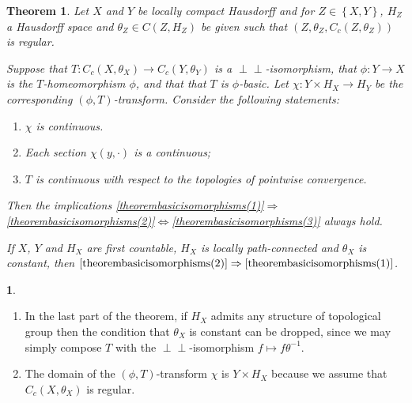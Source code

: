 \documentclass[letter,11pt]{amsart}
\theoremstyle{plain}		\newtheorem{theorem}[generalnumbering]{Theorem}
\theoremstyle{plain}		\newtheorem{corollary}[generalnumbering]{Corollary}
\theoremstyle{definition}		\newtheorem{definition}[generalnumbering]{Definition}
\theoremstyle{definition}		\newtheorem{example}[generalnumbering]{Example}
\theoremstyle{plain}		\newtheorem{proposition}[generalnumbering]{Proposition}
\theoremstyle{plain}		\newtheorem{lemma}[generalnumbering]{Lemma}
\newcommand{\namedenvironment}{}
\theoremstyle{definition}
\newtheorem*{theoremfornamed}{\namedenvironment}
\newenvironment{named}[1]{\renewcommand{\namedenvironment}{#1}\begin{theoremfornamed}}{\end{theoremfornamed}}
\newcommand{\perpp}{\perp\!\!\!\perp}
\begin{document}
\begin{theorem}\label{theorembasicisomorphisms}
	Let $X$ and $Y$ be locally compact Hausdorff and for $Z\in\left\{X,Y\right\}$, $H_Z$ a Hausdorff space and $\theta_Z\in C(Z,H_Z)$ be given such that $(Z,\theta_Z,C_c(Z,\theta_Z))$ is regular.
	
	Suppose that $T\colon C_c(X,\theta_X)\to C_c(Y,\theta_Y)$ is a $\perpp$-isomorphism, that $\phi\colon Y\to X$ is the $T$-homeomorphism $\phi$, and that that $T$ is $\phi$-basic. Let $\chi\colon Y\times H_X\to H_Y$ be the corresponding $(\phi,T)$-transform. Consider the following statements:
	\begin{enumerate}[label=(\roman*)]
		\item\label{theorembasicisomorphisms(1)} $\chi$ is continuous.
		\item\label{theorembasicisomorphisms(2)} Each section $\chi(y,\cdot)$ is a continuous;
		\item\label{theorembasicisomorphisms(3)} $T$ is continuous with respect to the topologies of pointwise convergence.
	\end{enumerate}
	Then the implications \ref{theorembasicisomorphisms(1)}$\Rightarrow$\ref{theorembasicisomorphisms(2)}$\iff$\ref{theorembasicisomorphisms(3)} always hold.
	
	If $X$, $Y$ and $H_X$ are first countable, $H_X$ is locally path-connected and $\theta_X$ is constant, then $\ref{theorembasicisomorphisms(2)}\Rightarrow \ref{theorembasicisomorphisms(1)}$.
\end{theorem}

\begin{named}{Remarks}
	\begin{enumerate}[label=(\arabic*)]
		\item In the last part of the theorem, if $H_X$ admits any structure of topological group then the condition that $\theta_X$ is constant can be dropped, since we may simply compose $T$ with the $\perpp$-isomorphism $f\mapsto f\theta^{-1}$.
		\item The domain of the $(\phi,T)$-transform $\chi$ is $Y\times H_X$ because we assume that $C_c(X,\theta_X)$ is regular.
	\end{enumerate}
\end{named}
\end{document}
